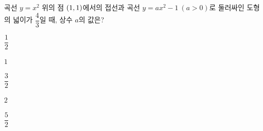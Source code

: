 곡선 $y=x^2$ 위의 점 $(1{,}\mkern3mu\mathopen{}1)$에서의 접선과 곡선 $y=ax^2-1\ (a>0)$로 둘러싸인 도형의 넓이가 $\dfrac{4}{3}$일 때, 상수 $a$의 값은?
\begin{choices32}{\rule[-3ex]{0pt}{8ex}$\dfrac{1}{2}$}{\rule[-3ex]{0pt}{8ex}$1$}{\rule[-3ex]{0pt}{8ex}$\dfrac{3}{2}$}{\rule[-3ex]{0pt}{8ex}$2$}{\rule[-3ex]{0pt}{8ex}$\dfrac{5}{2}$}\end{choices32}
